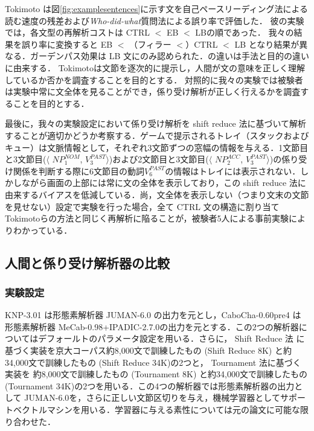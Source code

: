 \documentclass[japanese]{jnlp_1.4}
\def\modified#1{}
\begin{document}
\modified{質問法は読む速度が得られる手法との組み合わせて行われることが多い．}
Tokimoto は図\ref{fig:examplesentences}に示す文を自己ペースリーディング法による読む速度の残差および{\it Who-did-what}質問法による誤り率で評価した．
彼の実験では，各文型の再解析コストは CTRL $<$ EB $<$ LBの順であった．
我々の結果を誤り率に変換すると EB $<$ （フィラー $<$）CTRL $<$ LB となり結果が異なる．ガーデンパス効果は LB 文にのみ認められた．{\modified この違いは手法と目的の違いに由来する．
Tokimotoは文節を逐次的に提示し，人間が文の意味を正しく理解しているか否かを調査することを目的とする．
対照的に我々の実験では被験者は実験中常に文全体を見ることができ，係り受け解析が正しく行えるかを調査することを目的とする．}

最後に，我々の実験設定において係り受け解析を shift reduce 法に基づいて解析することが適切かどうか考察する．ゲームで提示されるトレイ（スタックおよびキュー）は文脈情報として，それぞれ3文節ずつの窓幅の情報を与える．1文節目と3文節目($\langle$ $NP^{NOM}_1$, $V^{PAST}_3 \rangle$)および2文節目と3文節目($\langle$ $NP^{ACC}_2$, $V^{PAST}_3 \rangle$)の係り受け関係を判断する際に6文節目の動詞$V^{PAST}_6$の情報はトレイには表示されない．しかしながら画面の上部には常に文の全体を表示しており，この shift reduce 法に由来するバイアスを低減している．尚，文全体を表示しない（つまり文末の文節を見せない）設定で実験を行った場合，全て CTRL 文の構造に割り当て Tokimotoらの方法と同じく再解析に陥ることが，被験者5人による事前実験によりわかっている．



\subsection{人間と係り受け解析器の比較}

\subsubsection{実験設定}

\modified{\ref{subsec:5.1}節の心理言語実験で用いた 60文を各種係り受け解析器で解析することにより，人間による結果と6種類の係り受け解析器の結果とを比較する．}
KNP-3.01 は形態素解析器 JUMAN-6.0 の出力を元とし，CaboCha-0.60pre4 は形態素解析器 MeCab-0.98+IPADIC-2.7.0の出力を元とする．この2つの解析器についてはデフォールトのパラメータ設定を用いる．さらに，
Shift Reduce 法\cite{Sassano04} に基づく実装を京大コーパス約8,000文で訓練したもの (Shift Reduce 8K) と約34,000文で訓練したもの (Shift Reduce 34K)の2つと，
Tournament 法\cite{Iwatate08}に基づく実装を 約8,000文で訓練したもの (Tournament 8K) と約34,000文で訓練したもの(Tournament 34K)の2つを用いる．この4つの解析器では形態素解析器の出力として JUMAN-6.0を，さらに正しい文節区切りを与え，機械学習器としてサポートベクトルマシンを用いる．学習器に与える素性については元の論文に可能な限り合わせた．
\end{document}
